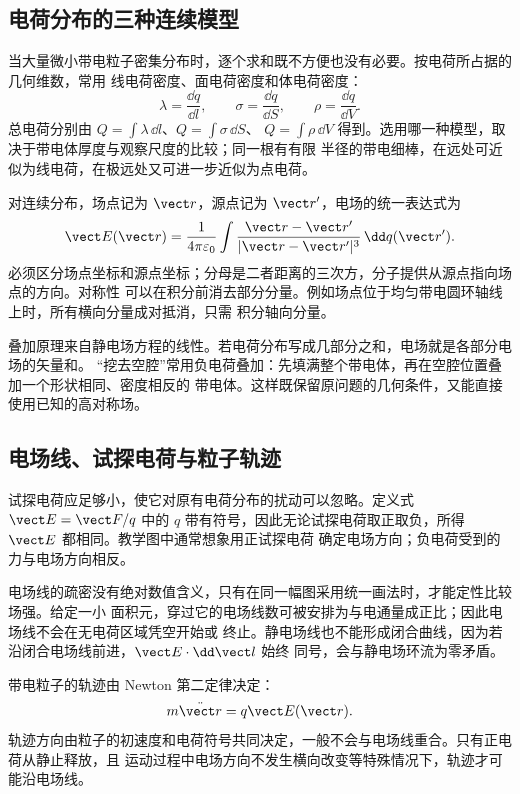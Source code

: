 \subsection*{电荷分布的三种连续模型}

当大量微小带电粒子密集分布时，逐个求和既不方便也没有必要。按电荷所占据的几何维数，常用
线电荷密度、面电荷密度和体电荷密度：
\begin{equation}
 \lambda=\frac{\dd q}{\dd l},
 \qquad
 \sigma=\frac{\dd q}{\dd S},
 \qquad
 \rho=\frac{\dd q}{\dd V}.
\end{equation}
总电荷分别由 $Q=\int\lambda\,\dd l$、$Q=\int\sigma\,\dd S$、
$Q=\int\rho\,\dd V$ 得到。选用哪一种模型，取决于带电体厚度与观察尺度的比较；同一根有有限
半径的带电细棒，在远处可近似为线电荷，在极远处又可进一步近似为点电荷。

对连续分布，场点记为 $\vect r$，源点记为 $\vect r'$，电场的统一表达式为
\begin{equation}
 \vect E(\vect r)=\frac1{4\pi\varepsilon_0}
 \int\frac{\vect r-\vect r'}{|\vect r-\vect r'|^3}\,\dd q(\vect r').
\end{equation}
必须区分场点坐标和源点坐标；分母是二者距离的三次方，分子提供从源点指向场点的方向。对称性
可以在积分前消去部分分量。例如场点位于均匀带电圆环轴线上时，所有横向分量成对抵消，只需
积分轴向分量。

叠加原理来自静电场方程的线性。若电荷分布写成几部分之和，电场就是各部分电场的矢量和。
“挖去空腔”常用负电荷叠加：先填满整个带电体，再在空腔位置叠加一个形状相同、密度相反的
带电体。这样既保留原问题的几何条件，又能直接使用已知的高对称场。

\subsection*{电场线、试探电荷与粒子轨迹}

试探电荷应足够小，使它对原有电荷分布的扰动可以忽略。定义式 $\vect E=\vect F/q$ 中的 $q$
带有符号，因此无论试探电荷取正取负，所得 $\vect E$ 都相同。教学图中通常想象用正试探电荷
确定电场方向；负电荷受到的力与电场方向相反。

电场线的疏密没有绝对数值含义，只有在同一幅图采用统一画法时，才能定性比较场强。给定一小
面积元，穿过它的电场线数可被安排为与电通量成正比；因此电场线不会在无电荷区域凭空开始或
终止。静电场线也不能形成闭合曲线，因为若沿闭合电场线前进，$\vect E\cdot\dd\vect l$ 始终
同号，会与静电场环流为零矛盾。

带电粒子的轨迹由 Newton 第二定律决定：
\begin{equation}
 m\ddot{\vect r}=q\vect E(\vect r).
\end{equation}
轨迹方向由粒子的初速度和电荷符号共同决定，一般不会与电场线重合。只有正电荷从静止释放，且
运动过程中电场方向不发生横向改变等特殊情况下，轨迹才可能沿电场线。

